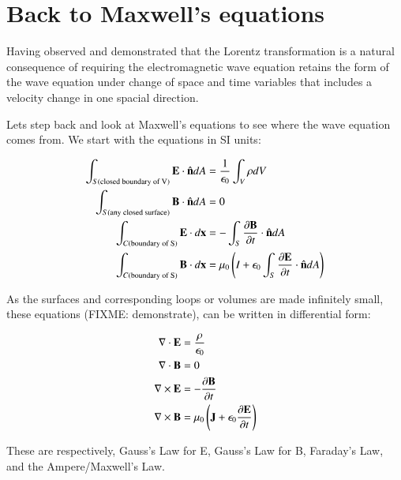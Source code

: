 \documentclass{article}      %
\title{} %
\author{Peeter Joot}         %
\date{ July 12, 2008 }        %
\newcommand{\grad}[0]{\nabla}
\begin{document}

\maketitle{}

\section{ Back to Maxwell's equations }

Having observed and demonstrated that the Lorentz transformation is a natural consequence of requiring the electromagnetic wave equation retains the
form of the wave equation under change of space and time variables that includes a velocity change in one spacial direction.

Lets step back and look at Maxwell's equations to see where the wave equation comes from.  We start with the equations in SI units:

\begin{align*}
\int_{S(\text{closed boundary of V})} \mathbf{E} \cdot \hat{\mathbf{n}} dA &= \frac{1}{\epsilon_0} \int_V \rho dV \\
\int_{S(\text{any closed surface})} \mathbf{B} \cdot \hat{\mathbf{n}} dA &= 0 \\
\int_{C(\text{boundary of S})} \mathbf{E} \cdot d\mathbf{x} &= - \int_{S} \frac{\partial \mathbf{B}}{\partial t} \cdot \hat{\mathbf{n}} dA \\
\int_{C(\text{boundary of S})} \mathbf{B} \cdot d\mathbf{x} &= \mu_0\left(I + \epsilon_0\int_{S} \frac{\partial \mathbf{E}}{\partial t} \cdot \hat{\mathbf{n}} dA\right) \\
\end{align*}

As the surfaces and corresponding loops or volumes are made infinitely small, these equations (FIXME: demonstrate), can be written in differential form:

\begin{align*}
\grad \cdot \BE &= \frac{\rho}{\epsilon_0} \\
\grad \cdot \BB &= 0 \\
\grad \cross \BE &= - \frac{\partial \BB}{\partial t} \\
\grad \cross \BB &= \mu_0\left(\BJ + \epsilon_0 \frac{\partial \BE}{\partial t}\right) \\
\end{align*}

These are respectively, Gauss's Law for E, Gauss's Law for B, Faraday's Law, and the Ampere/Maxwell's Law.
\end{document}
